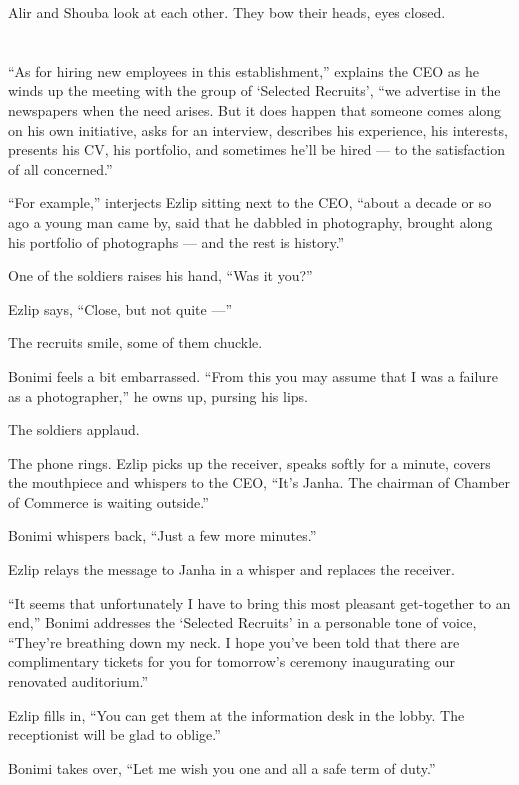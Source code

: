 \documentclass[twoside,11pt,openany]{book}
\begin{document}
Alir and Shouba look at each other. They bow their heads, eyes closed.


\chapter{}

``As for hiring new employees in this establishment,{}'' explains the CEO as he winds up the meeting with
the group of `Selected Recruits', ``we advertise in the newspapers when the need arises. But it does happen that
someone comes along on his own initiative, asks for an interview, describes his experience, his interests, presents his
CV, his portfolio, and sometimes he'll be hired --- to the satisfaction of all concerned.''

``For example,'' interjects Ezlip sitting next to the CEO, ``about a decade or so
ago a young man came by, said that he dabbled in photography, brought along his portfolio of photographs --- and the rest
is history.''

One of the soldiers raises his hand, ``Was it you?''

Ezlip says, ``Close, but not quite ---''

The recruits smile, some of them chuckle{.}

Bonimi feels a bit embarrassed. ``From this you may assume that I was a failure as a
photographer,'' he owns up, pursing his lips.

The soldiers applaud.

The phone rings. Ezlip picks up the receiver, speaks softly for a minute, covers the mouthpiece and whispers to the CEO,
``It's Janha. The chairman of Chamber of Commerce is waiting outside.''

Bonimi whispers back, ``Just a few more minutes.''

Ezlip relays the message to Janha in a whisper and replaces the receiver.

``It seems that unfortunately I have to bring this most pleasant get-together to an
end,'' Bonimi addresses the `Selected Recruits' in a personable tone of voice, ``They're
breathing down my neck. I hope you've been told that there are complimentary tickets for you for
tomorrow's ceremony inaugurating our renovated auditorium.''

Ezlip fills in, ``You can get them at the information desk in the lobby. The receptionist will be glad to
oblige.''

Bonimi takes over, ``Let me wish you one and all a safe term of duty.''
\end{document}
